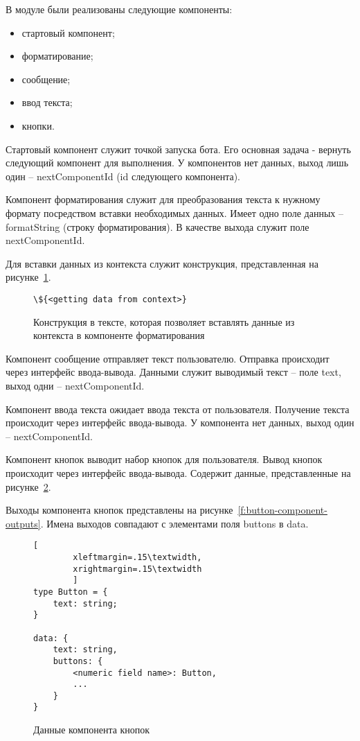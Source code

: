 В модуле были реализованы следующие компоненты:
\begin{itemize}
	\item стартовый компонент;
	\item форматирование;
	\item сообщение;
	\item ввод текста;
	\item кнопки.
\end{itemize}


Стартовый компонент служит точкой запуска бота. Его основная задача
- вернуть следующий компонент для выполнения. У компонентов нет данных,
выход лишь один – nextComponentId (id следующего компонента).

Компонент форматирования служит для преобразования текста к
нужному формату посредством вставки необходимых данных. Имеет одно
поле данных – formatString (строку форматирования). В качестве выхода
служит поле nextComponentId.

Для вставки данных из контекста служит
конструкция, представленная на рисунке~\ref{f:format-construct}.


\begin{figure}[ht]
	\centering
	\vspace{\toppaddingoffigure}
	\begin{lstlisting}
\${<getting data from context>}
    \end{lstlisting}
	\caption{Конструкция в тексте, которая позволяет вставлять данные из
		контекста в компоненте форматирования}
	\label{f:format-construct}
\end{figure}


Компонент сообщение отправляет текст пользователю. Отправка
происходит через интерфейс ввода-вывода. Данными служит выводимый
текст – поле text, выход одни – nextComponentId.

Компонент ввода текста ожидает ввода текста от пользователя.
Получение текста происходит через интерфейс ввода-вывода. У компонента
нет данных, выход один – nextComponentId.

Компонент кнопок выводит набор кнопок для пользователя. Вывод
кнопок происходит через интерфейс ввода-вывода.
Содержит данные, представленные на рисунке~\ref{f:button-component-data}.

Выходы компонента кнопок представлены на рисунке~\ref{f:button-component-outputs}.
Имена выходов совпадают с элементами поля buttons в data.

\begin{figure}[ht]
	\centering
	\vspace{\toppaddingoffigure}
	\begin{lstlisting}[
        xleftmargin=.15\textwidth,
        xrightmargin=.15\textwidth
        ]
type Button = {
    text: string;
}

data: {
    text: string,
    buttons: {
        <numeric field name>: Button,
        ...
    }
}
    \end{lstlisting}
	\caption{Данные компонента кнопок}
	\label{f:button-component-data}
\end{figure}

